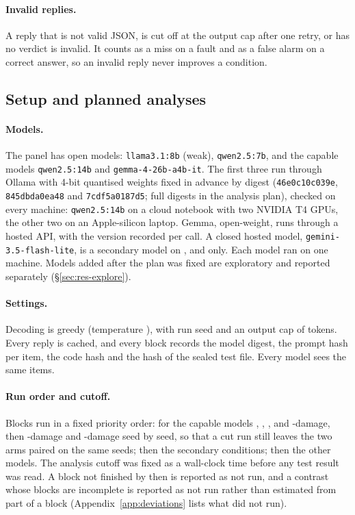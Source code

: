 \paragraph{Invalid replies.}
A reply that is not valid JSON, is cut off at the output cap after one retry, or has no verdict is invalid. It counts as a
miss on a fault and as a false alarm on a correct answer, so an invalid reply never improves a condition.

\subsection{Setup and planned analyses}
\label{app:study1-planned}
\label{sec:setup}

\paragraph{Models.}
The panel has \NPanelModels{} open models: \texttt{llama3.1:8b} (weak), \texttt{qwen2.5:7b}, and the \NCapable{} capable
models \texttt{qwen2.5:14b} and \texttt{gemma-4-26b-a4b-it}. The first three run through Ollama with 4-bit quantised
weights fixed in advance by digest (\texttt{46e0c10c039e}, \texttt{845dbda0ea48} and \texttt{7cdf5a0187d5}; full digests
in the analysis plan), checked on every machine: \texttt{qwen2.5:14b} on a cloud notebook with two NVIDIA T4 GPUs, the
other two on an Apple-silicon laptop. Gemma, open-weight, runs through a hosted API, with the version recorded per call.
A closed hosted model, \texttt{gemini-3.5-flash-lite}, is a secondary model on ,  and  only.
Each model ran on one machine. Models added after the plan was fixed are exploratory and reported separately
(\S\ref{sec:res-explore}).

\paragraph{Settings.}
Decoding is greedy (temperature \Temperature), with run seed \RunSeed{} and an output cap of \OutputCap{} tokens. Every
reply is cached, and every block records the model digest, the prompt hash per item, the code hash and the hash of the
sealed test file. Every model sees the same items.

\paragraph{Run order and cutoff.}
Blocks run in a fixed priority order: for the capable models , , ,  and
-damage, then -damage and -damage seed by seed, so that a cut run still leaves the two arms
paired on the same seeds; then the secondary conditions; then the other models. The analysis cutoff was fixed as a
wall-clock time before any test result was read. A block not finished by then is reported as not run, and a contrast whose blocks are
incomplete is reported as not run rather than estimated from part of a block (Appendix~\ref{app:deviations} lists what
did not run).


